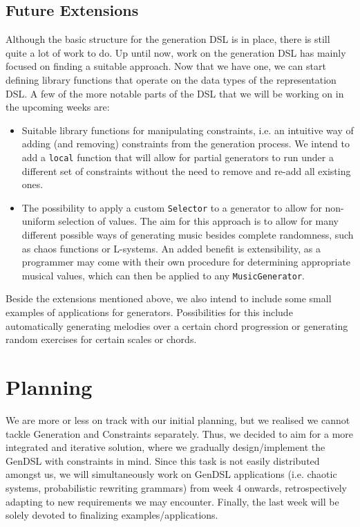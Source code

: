 \documentclass[11pt,a4paper]{article}
\newcommand{\icode}[1]{\texttt{#1}}
\begin{document}
\subsection{Future Extensions}
Although the basic structure for the generation DSL is in place, there is still quite a lot of work to do. Up until now, work on the generation DSL has mainly focused on finding a suitable approach. Now that we have one, we can start defining library functions that operate on the data types of the representation DSL. A few of the more notable parts of the DSL that we will be working on in the upcoming weeks are:
\begin{itemize}
\item
Suitable library functions for manipulating constraints, i.e. an intuitive way of adding (and removing) constraints from the generation process. We intend to add a \icode{local} function that will allow for partial generators to run under a different set of constraints without the need to remove and re-add all existing ones.
\item
The possibility to apply a custom \icode{Selector} to a generator to allow for non-uniform selection of values. The aim for this approach is to allow for many different possible ways of generating music besides complete randomness, such as chaos functions or L-systems. An added benefit is extensibility, as a programmer may come with their own procedure for determining appropriate musical values, which can then be applied to any \icode{MusicGenerator}.
\end{itemize}

Beside the extensions mentioned above, we also intend to include some small examples of applications for generators. Possibilities for this include automatically generating melodies over a certain chord progression or generating random exercises for certain scales or chords.

\section{Planning}
We are more or less on track with our initial planning, but we realised we cannot tackle Generation and Constraints separately. Thus, we decided to aim for a more integrated and iterative solution, where we gradually design/implement the GenDSL with constraints in mind. Since this task is not easily distributed amongst us, we will simultaneously work on GenDSL applications (i.e. chaotic systems, probabilistic rewriting grammars) from week 4 onwards, retrospectively adapting to new requirements we may encounter. Finally, the last week will be solely devoted to finalizing examples/applications.
\end{document}
